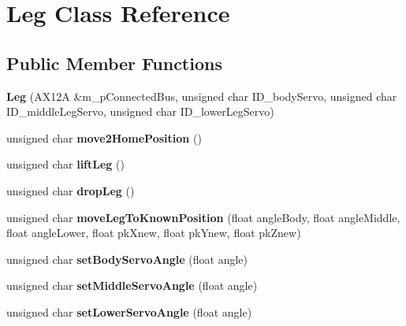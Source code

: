 \hypertarget{class_leg}{}\section{Leg Class Reference}
\label{class_leg}
\subsection*{Public Member Functions}
\begin{DoxyCompactItemize}
\item 
\mbox{\label{class_leg_ab3490019b9bbb3a8bcc32691bf5a6e75}} 
{\bfseries Leg} (A\+X12A \&m\+\_\+p\+Connected\+Bus, unsigned char I\+D\+\_\+body\+Servo, unsigned char I\+D\+\_\+middle\+Leg\+Servo, unsigned char I\+D\+\_\+lower\+Leg\+Servo)
\item 
\mbox{\label{class_leg_a62128cac5af3c307cb7a836d660c4a93}} 
unsigned char {\bfseries move2\+Home\+Position} ()
\item 
\mbox{\label{class_leg_a7e1d28688ebca828c02eb69d29440701}} 
unsigned char {\bfseries lift\+Leg} ()
\item 
\mbox{\label{class_leg_a4c42b41dc29e07e35a82856addb9e2c7}} 
unsigned char {\bfseries drop\+Leg} ()
\item 
\mbox{\label{class_leg_ad65204bbf94601d091e775b011bc0ac4}} 
unsigned char {\bfseries move\+Leg\+To\+Known\+Position} (float angle\+Body, float angle\+Middle, float angle\+Lower, float pk\+Xnew, float pk\+Ynew, float pk\+Znew)
\item 
\mbox{\label{class_leg_a1cabc989ff35134313cff1c6349fa5ed}} 
unsigned char {\bfseries set\+Body\+Servo\+Angle} (float angle)
\item 
\mbox{\label{class_leg_a66cf5a6988aa5533dd22999de75494d5}} 
unsigned char {\bfseries set\+Middle\+Servo\+Angle} (float angle)
\item 
\mbox{\label{class_leg_a996c44acd7afbdaa955614535492ff2b}} 
unsigned char {\bfseries set\+Lower\+Servo\+Angle} (float angle)
\end{DoxyCompactItemize}
